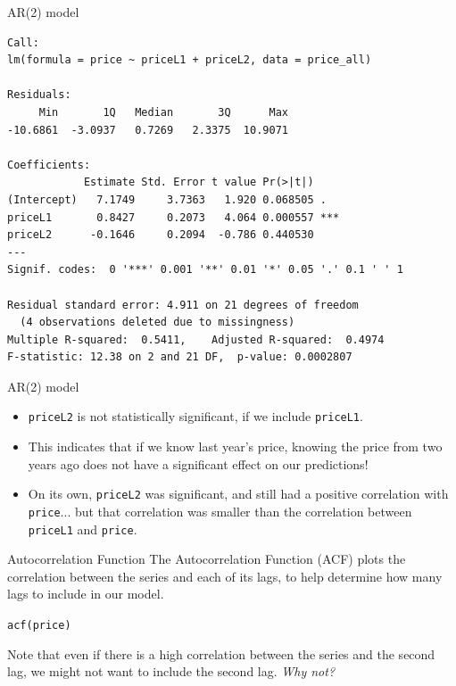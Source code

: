 \documentclass{beamer}\usepackage[]{graphicx}\usepackage[]{color}
\makeatletter
\newcommand{\hlstd}[1]{\textcolor[rgb]{1,0.894,0.769}{#1}}%
\newcommand{\hlkwd}[1]{\textcolor[rgb]{1,0.78,0.769}{#1}}%
\newenvironment{kframe}{%
 \def\at@end@of@kframe{}%
 \ifinner\ifhmode%
  \def\at@end@of@kframe{\end{minipage}}%
  \begin{minipage}{\columnwidth}%
 \fi\fi%
 \def\FrameCommand##1{\hskip\@totalleftmargin \hskip-\fboxsep
 \colorbox{shadecolor}{##1}\hskip-\fboxsep
     \hskip-\linewidth \hskip-\@totalleftmargin \hskip\columnwidth}%
 \MakeFramed {\advance\hsize-\width
   \@totalleftmargin\z@ \linewidth\hsize
   \@setminipage}}%
 {\par\unskip\endMakeFramed%
 \at@end@of@kframe}
\newenvironment{knitrout}{}{} %
\makeatother
\begin{document}
\begin{darkframes}
\begin{frame}[fragile]{AR(2) model}
\begin{knitrout}
\begin{kframe}
\begin{verbatim}
Call:
lm(formula = price ~ priceL1 + priceL2, data = price_all)

Residuals:
     Min       1Q   Median       3Q      Max 
-10.6861  -3.0937   0.7269   2.3375  10.9071 

Coefficients:
            Estimate Std. Error t value Pr(>|t|)    
(Intercept)   7.1749     3.7363   1.920 0.068505 .  
priceL1       0.8427     0.2073   4.064 0.000557 ***
priceL2      -0.1646     0.2094  -0.786 0.440530    
---
Signif. codes:  0 '***' 0.001 '**' 0.01 '*' 0.05 '.' 0.1 ' ' 1

Residual standard error: 4.911 on 21 degrees of freedom
  (4 observations deleted due to missingness)
Multiple R-squared:  0.5411,	Adjusted R-squared:  0.4974 
F-statistic: 12.38 on 2 and 21 DF,  p-value: 0.0002807
\end{verbatim}
\end{kframe}
\end{knitrout}
\end{frame}
    
    
    
\begin{frame}[fragile]{AR(2) model}  
      \begin{itemize}
      \item \texttt{priceL2} is not statistically significant, if we include \texttt{priceL1}. 
      \pause
      \item This indicates that if we know last year's price, knowing the price from two years ago does not have a significant effect on our predictions!
      \pause
      \item On its own, \texttt{priceL2} was significant, and still had a positive correlation with \texttt{price}... but that correlation was smaller than the correlation between \texttt{priceL1} and \texttt{price}.
      \end{itemize}
\end{frame}      

\begin{frame}[fragile]{Autocorrelation Function}     
      The \alert{Autocorrelation Function (ACF)} plots the correlation between the series and each of its lags, to help determine how many lags to include in our model.
\begin{knitrout}
\begin{kframe}
\begin{alltt}
\hlkwd{acf}\hlstd{(price)}
\end{alltt}
\end{kframe}


\end{knitrout}
      
      Note that even if there is a high correlation between the series and the second lag, we might not want to include the second lag. \textit{Why not?}
    
\end{frame}
    
    
    
      
  \end{darkframes}
\end{document}

